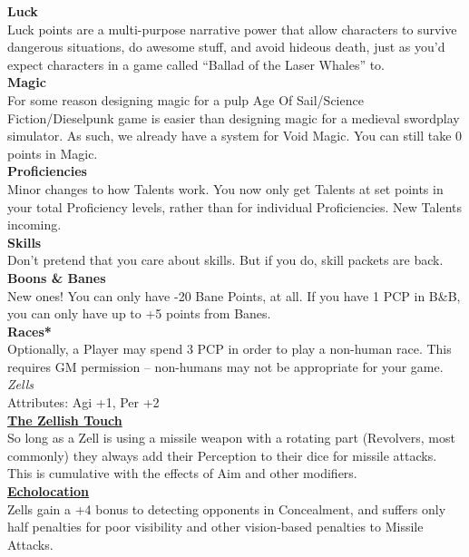 \documentclass[a4paper, twocolumn, openany]{book}
\newlength{\indentlen}
\newcommand{\tabto}[1]{\setlength{\leftskip}{#1\indentlen}}
\begin{document}
{{\bfseries Luck\\}
Luck points are a multi-purpose narrative power that allow characters to survive dangerous
situations, do awesome stuff, and avoid hideous death, just as you’d expect characters in a
game called “Ballad of the Laser Whales” to.\\

{\bfseries Magic\\}
For some reason designing magic for a pulp Age Of Sail/Science Fiction/Dieselpunk game is
easier than designing magic for a medieval swordplay simulator. As such, we already have a
system for Void Magic. You can still take 0 points in Magic.\\

{\bfseries Proficiencies\\}
Minor changes to how Talents work. You now only get Talents at set points in your total
Proficiency levels, rather than for individual Proficiencies. New Talents incoming.\\

{\bfseries Skills\\}
Don’t pretend that you care about skills. But if you do, skill packets are back.\\

{\bfseries Boons \& Banes\\}
New ones! You can only have -20 Bane Points, at all. If you have 1 PCP in B\&B, you can only
have up to +5 points from Banes.\\

{\bfseries Races*\\}
Optionally, a Player may spend 3 PCP in order to play a non-human race. This requires GM
permission -- non-humans may not be appropriate for your game.\\

{\large\itshape Zells\\}
Attributes: Agi +1, Per +2\\

\tabto{1}
	\underline{\bfseries The Zellish Touch}\\
	So long as a Zell is using a missile weapon with a rotating part (Revolvers, most
	commonly) they always add their Perception to their dice for missile attacks. This is
	cumulative with the effects of Aim and other modifiers.\\

	\underline{\bfseries Echolocation}\\
	Zells gain a +4 bonus to detecting opponents in Concealment, and suffers only half
	penalties for poor visibility and other vision-based penalties to Missile Attacks.\\

}
\end{document}
